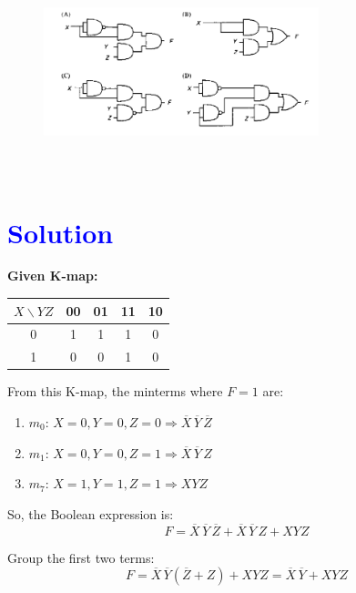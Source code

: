 \documentclass[a4paper,12pt]{article}
\begin{document}
\vspace{1em}
\begin{figure}[!h]
 \centering
     \includegraphics[width=8cm,height=6cm]{img2.png}
     \caption{}

 \end{figure}
 \section*{\textcolor{blue}{Solution}}
 
\textbf{Given K-map:}
\vspace{1cm}
\noindent
\begin{center}
\begin{tabular}{|c|c|c|c|c|}
\hline
\( X \backslash YZ \) & 00 & 01 & 11 & 10 \\
\hline
0 & 1 & 1 & 1 & 0 \\
\hline
1 & 0 & 0 & 1 & 0 \\
\hline
\end{tabular}
\end{center}
\vspace{0.5em}

From this K-map, the minterms where \( F = 1 \) are:

\begin{enumerate}
    \item \( m_0 \): \( X = 0, Y = 0, Z = 0 \Rightarrow \overline{X} \, \overline{Y} \, \overline{Z} \)
    \item \( m_1 \): \( X = 0, Y = 0, Z = 1 \Rightarrow \overline{X} \, \overline{Y} \, Z \)
    \item \( m_7 \): \( X = 1, Y = 1, Z = 1 \Rightarrow X Y Z \)
\end{enumerate}

So, the Boolean expression is:
\[
F = \overline{X} \, \overline{Y} \, \overline{Z} + \overline{X} \, \overline{Y} \, Z + X Y Z
\]

Group the first two terms:
\[
F = \overline{X} \, \overline{Y} (\overline{Z} + Z) + X Y Z = \overline{X} \, \overline{Y} + X Y Z
\]
\end{document}
